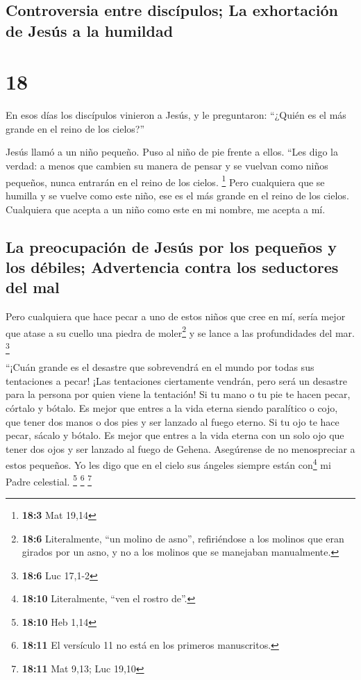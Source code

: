\hypertarget{controversia-entre-discuxedpulos-la-exhortaciuxf3n-de-jesuxfas-a-la-humildad}{%
\subsection{Controversia entre discípulos; La exhortación de Jesús a la
humildad}\label{controversia-entre-discuxedpulos-la-exhortaciuxf3n-de-jesuxfas-a-la-humildad}}

\hypertarget{section-17}{%
\section{18}\label{section-17}}

 En esos días los discípulos vinieron a Jesús, y le
preguntaron: ``¿Quién es el más grande en el reino de los cielos?''

 Jesús llamó a un niño pequeño. Puso al niño de pie frente
a ellos.  ``Les digo la verdad: a menos que cambien su
manera de pensar y se vuelvan como niños pequeños, nunca entrarán en el
reino de los cielos. \footnote{\textbf{18:3} Mat 19,14} 
Pero cualquiera que se humilla y se vuelve como este niño, ese es el más
grande en el reino de los cielos.  Cualquiera que acepta a
un niño como este en mi nombre, me acepta a mí.

\hypertarget{la-preocupaciuxf3n-de-jesuxfas-por-los-pequeuxf1os-y-los-duxe9biles-advertencia-contra-los-seductores-del-mal}{%
\subsection{La preocupación de Jesús por los pequeños y los débiles;
Advertencia contra los seductores del
mal}\label{la-preocupaciuxf3n-de-jesuxfas-por-los-pequeuxf1os-y-los-duxe9biles-advertencia-contra-los-seductores-del-mal}}

 Pero cualquiera que hace pecar a uno de estos niños que
cree en mí, sería mejor que atase a su cuello una piedra de
moler\footnote{\textbf{18:6} Literalmente, ``un molino de asno'',
  refiriéndose a los molinos que eran girados por un asno, y no a los
  molinos que se manejaban manualmente.} y se lance a las profundidades
del mar. \footnote{\textbf{18:6} Luc 17,1-2}

 ``¡Cuán grande es el desastre que sobrevendrá en el mundo
por todas sus tentaciones a pecar! ¡Las tentaciones ciertamente vendrán,
pero será un desastre para la persona por quien viene la tentación!
 Si tu mano o tu pie te hacen pecar, córtalo y bótalo. Es
mejor que entres a la vida eterna siendo paralítico o cojo, que tener
dos manos o dos pies y ser lanzado al fuego eterno.  Si tu
ojo te hace pecar, sácalo y bótalo. Es mejor que entres a la vida eterna
con un solo ojo que tener dos ojos y ser lanzado al fuego de Gehena.
 Asegúrense de no menospreciar a estos pequeños. Yo les
digo que en el cielo sus ángeles siempre están con\footnote{\textbf{18:10}
  Literalmente, ``ven el rostro de''.} mi Padre celestial. \footnote{\textbf{18:10}
  Heb 1,14}  \footnote{\textbf{18:11} El versículo 11 no
  está en los primeros manuscritos.} \footnote{\textbf{18:11} Mat 9,13;
  Luc 19,10}

